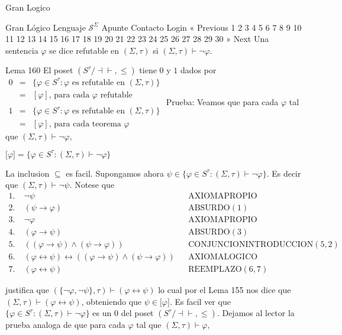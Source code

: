 Gran Logico

Gran Lógico
Lenguaje \(\mathcal{S}^{\Sigma }\)
Apunte
Contacto
Login
« Previous
1
2
3
4
5
6
7
8
9
10
11
12
13
14
15
16
17
18
19
20
21
22
23
24
25
26
27
28
29
30
» Next
Una sentencia \(\varphi \) se dice refutable en \((\Sigma ,\tau )\) si \( (\Sigma ,\tau )\vdash \lnot \varphi \).

Lema 160 El poset \((S^{\tau }/\mathrm{\dashv \vdash },\leq )\) tiene \(0\) y \(1\) dados por
\(\displaystyle \begin{array}{lll} 0 & = & \{\varphi \in S^{\tau }:\varphi \text{ es refutable en }(\Sigma ,\tau )\} \\ & = & [\varphi ]\text{, para cada }\varphi \text{ refutable} \\ & & \\ 1 & = & \{\varphi \in S^{\tau }:\varphi \text{ es refutable en }(\Sigma ,\tau )\} \\ & = & [\varphi ]\text{, para cada teorema }\varphi \end{array} \)
Prueba: Veamos que para cada \(\varphi \) tal que \((\Sigma ,\tau )\vdash \lnot \varphi ,\)

\(\displaystyle \lbrack \varphi ]=\{\varphi \in S^{\tau }:(\Sigma ,\tau )\vdash \lnot \varphi \} \)

La inclusion \(\subseteq \) es facil. Supongamos ahora \(\psi \in \{\varphi \in S^{\tau }:(\Sigma ,\tau )\vdash \lnot \varphi \}.\) Es decir que \((\Sigma ,\tau )\vdash \lnot \psi .\) Notese que
\(\displaystyle \begin{array}{llll} 1.\; & \lnot \psi & & \text{AXIOMAPROPIO} \\ 2.\; & \left( \psi \rightarrow \varphi \right) & & \text{ABSURDO}(1) \\ 3.\; & \lnot \varphi & & \text{AXIOMAPROPIO} \\ 4.\; & (\varphi \rightarrow \psi ) & & \text{ABSURDO}(3) \\ 5. & ((\varphi \rightarrow \psi )\wedge (\psi \rightarrow \varphi )) & & \text{CONJUNCIONINTRODUCCION}(5,2) \\ 6. & (\varphi \leftrightarrow \psi )\leftrightarrow ((\varphi \rightarrow \psi )\wedge (\psi \rightarrow \varphi )) & & \text{AXIOMALOGICO} \\ 7. & (\varphi \leftrightarrow \psi ) & & \text{REEMPLAZO}(6,7) \end{array} \)

justifica que \((\{\lnot \varphi ,\lnot \psi \},\tau )\vdash (\varphi \leftrightarrow \psi )\) lo cual por el Lema 155 nos dice que \((\Sigma ,\tau )\vdash (\varphi \leftrightarrow \psi )\), obteniendo que \( \psi \in \lbrack \varphi ].\)
Es facil ver que \(\{\varphi \in S^{\tau }:(\Sigma ,\tau )\vdash \lnot \varphi \}\) es un \(0\) del poset \((S^{\tau }/\mathrm{\dashv \vdash },\leq ).\) Dejamos al lector la prueba analoga de que para cada \(\varphi \) tal que \( (\Sigma ,\tau )\vdash \varphi ,\)

